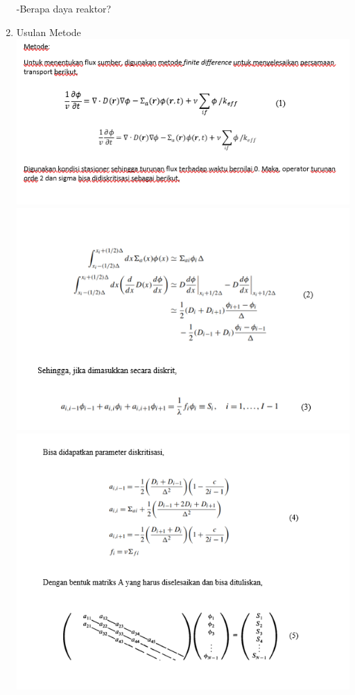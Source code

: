\documentclass[12pt]{article}
\begin{document}
\begin{enumerate}
		-Berapa daya reaktor?
		\item Usulan Metode \\
		\includegraphics[scale=1]{UASFiskom0501.png}\\
		\includegraphics[scale=1]{UASFiskom0502.png}\\
		\includegraphics[scale=1]{UASFiskom0503.png}\\

\end{enumerate}
\end{document}
